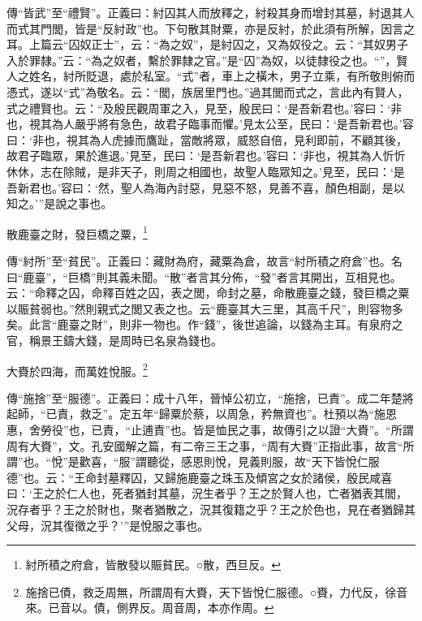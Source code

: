 {\noindent\zhuan{}\fzbyks 傳“皆武”至“禮賢”。正義曰：紂囚其人而放釋之，紂殺其身而增封其墓，紂退其人而式其門閭，皆是“反紂政”也。下句散其財粟，亦是反紂，於此須有所解，因言之耳。上篇云“囚奴正士”，云：“為之奴”，是紂囚之，又為奴役之。云：“其奴男子入於罪隸。”云：“為之奴者，繫於罪隸之官。”是“囚”為奴，以徒隸役之也。“”，賢人之姓名，紂所貶退，處於私室。“式”者，車上之橫木，男子立乘，有所敬則俯而憑式，遂以“式”為敬名。云：“閭，族居里門也。”過其閭而式之，言此內有賢人，式之禮賢也。云：“及殷民觀周軍之入，見至，殷民曰：‘是吾新君也。’容曰：‘非也，視其為人嚴乎將有急色，故君子臨事而懼。’見太公至，民曰：‘是吾新君也。’容曰：‘非也，視其為人虎據而鷹趾，當敵將眾，威怒自倍，見利即前，不顧其後，故君子臨眾，果於進退。’見至，民曰：‘是吾新君也。’容曰：‘非也，視其為人忻忻休休，志在除賊，是非天子，則周之相國也，故聖人臨眾知之。’見至，民曰：‘是吾新君也。’容曰：‘然，聖人為海內討惡，見惡不怒，見善不喜，顏色相副，是以知之。’”是說之事也。 \par}

散鹿臺之財，發巨橋之粟，\footnote{紂所積之府倉，皆散發以賑貧民。○散，西旦反。}

{\noindent\zhuan{}\fzbyks 傳“紂所”至“貧民”。正義曰：藏財為府，藏粟為倉，故言“紂所積之府倉”也。名曰“鹿臺”，“巨橋”則其義未聞。“散”者言其分佈，“發”者言其開出，互相見也。云：“命釋之囚，命釋百姓之囚，表之閭，命封之墓，命散鹿臺之錢，發巨橋之粟以賑貧弱也。”然則親式之閭又表之也。云“鹿臺其大三里，其高千尺”，則容物多矣。此言“鹿臺之財”，則非一物也。作“錢”，後世追論，以錢為主耳。有泉府之官，稱景王鑄大錢，是周時已名泉為錢也。 \par}

大賚於四海，而萬姓悅服。\footnote{施捨已債，救乏周無，所謂周有大賚，天下皆悅仁服德。○賚，力代反，徐音來。已音以。債，側界反。周音周，本亦作周。}

{\noindent\zhuan{}\fzbyks 傳“施捨”至“服德”。正義曰：成十八年，晉悼公初立，“施捨，已責”。成二年楚將起師，“已責，救乏”。定五年“歸粟於蔡，以周急，矜無資也”。杜預以為“施恩惠，舍勞役”也，已責，“止逋責”也。皆是恤民之事，故傳引之以證“大賚”。“所謂周有大賚”，文。孔安國解之篇，有二帝三王之事，“周有大賚”正指此事，故言“所謂”也。“悅”是歡喜，“服”謂聽從，感恩則悅，見義則服，故“天下皆悅仁服德”也。云：“王命封墓釋囚，又歸施鹿臺之珠玉及傾宮之女於諸侯，殷民咸喜曰：‘王之於仁人也，死者猶封其墓，況生者乎？王之於賢人也，亡者猶表其閭，況存者乎？王之於財也，聚者猶散之，況其復籍之乎？王之於色也，見在者猶歸其父母，況其復徵之乎？’”是悅服之事也。 \par}

